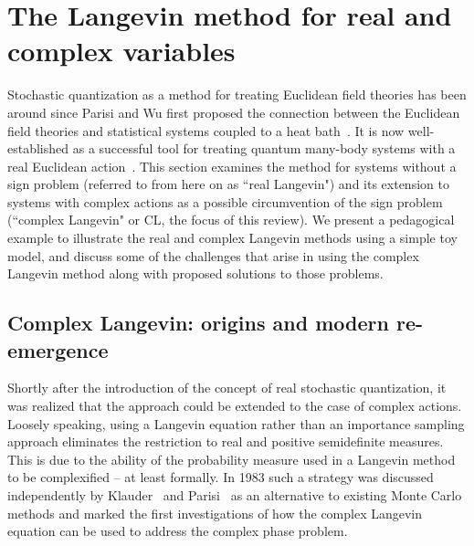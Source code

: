 \documentclass[../main.tex]{subfiles}
\begin{document}
\section{\label{sect:formalism}The Langevin method for real and complex variables}
Stochastic quantization as a method for treating Euclidean field theories has been around since Parisi and Wu first proposed the connection between the Euclidean field theories and statistical systems coupled to a heat bath~\cite{ParisiWu}. It is now well-established as a successful tool for treating quantum many-body systems with a real Euclidean action~\cite{PhysicsReportsStochasticQuantization}. This section examines the method for systems without a sign problem (referred to from here on as ``real Langevin") and its extension to systems with complex actions as a possible circumvention of the sign problem (``complex Langevin" or CL, the focus of this review). We present a pedagogical example to illustrate the real and complex Langevin methods using a simple toy model, and discuss some of the challenges that arise in using the complex Langevin method along with proposed solutions to those problems.

\subsection{Complex Langevin: origins and modern re-emergence~\label{sect:CL}}
Shortly after the introduction of the concept of real stochastic quantization, it was realized that the approach could be extended to the case of complex actions.
Loosely speaking, using a Langevin equation rather than an importance sampling approach eliminates the restriction to real and positive semidefinite measures. This is due to the ability of the probability measure used in a Langevin method to be complexified -- at least formally. In 1983 such a strategy was discussed independently by Klauder~\cite{Klauder1983a,Klauder1983b} and Parisi~\cite{Parisi1983} as an alternative to existing Monte Carlo methods and marked the first investigations of how the complex Langevin equation can be used to address the complex phase problem.
\end{document}
